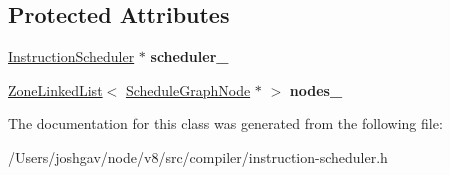 \subsection*{Protected Attributes}
\begin{DoxyCompactItemize}
\item 
\hyperlink{classv8_1_1internal_1_1compiler_1_1_instruction_scheduler}{Instruction\+Scheduler} $\ast$ {\bfseries scheduler\+\_\+}\hypertarget{classv8_1_1internal_1_1compiler_1_1_instruction_scheduler_1_1_scheduling_queue_base_ad65af82cde8e889a5809b775f84d4c42}{}\label{classv8_1_1internal_1_1compiler_1_1_instruction_scheduler_1_1_scheduling_queue_base_ad65af82cde8e889a5809b775f84d4c42}

\item 
\hyperlink{classv8_1_1internal_1_1_zone_linked_list}{Zone\+Linked\+List}$<$ \hyperlink{classv8_1_1internal_1_1compiler_1_1_instruction_scheduler_1_1_schedule_graph_node}{Schedule\+Graph\+Node} $\ast$ $>$ {\bfseries nodes\+\_\+}\hypertarget{classv8_1_1internal_1_1compiler_1_1_instruction_scheduler_1_1_scheduling_queue_base_a31416284ae62544373b8ff1ad07ce9d1}{}\label{classv8_1_1internal_1_1compiler_1_1_instruction_scheduler_1_1_scheduling_queue_base_a31416284ae62544373b8ff1ad07ce9d1}

\end{DoxyCompactItemize}


The documentation for this class was generated from the following file\+:\begin{DoxyCompactItemize}
\item 
/\+Users/joshgav/node/v8/src/compiler/instruction-\/scheduler.\+h\end{DoxyCompactItemize}
